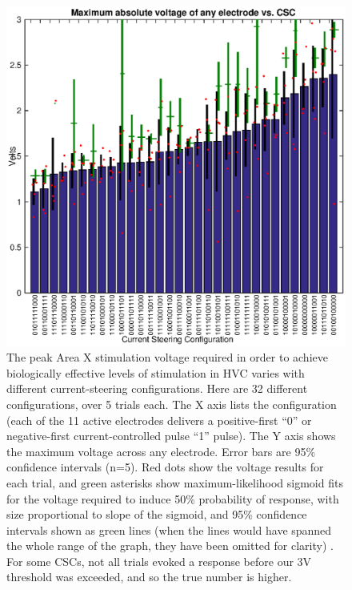 \documentclass[10pt,letterpaper]{article}
\begin{document}
\begin{figure}
  \includegraphics[width=\textwidth]{VoltageVsCSC}
  \caption{The peak Area X stimulation voltage required in order to achieve biologically effective levels of stimulation in HVC varies with different current-steering configurations.  Here are 32 different configurations, over 5 trials each.  The X axis lists the configuration (each of the 11 active electrodes delivers a positive-first ``0'' or negative-first current-controlled pulse ``1'' pulse).  The Y axis shows the maximum voltage across any electrode.  Error bars are 95\% confidence intervals (n=5).  Red dots show the voltage results for each trial, and green asterisks show maximum-likelihood sigmoid fits for the voltage required to induce 50\% probability of response, with size proportional to slope of the sigmoid, and 95\% confidence intervals shown as green lines (when the lines would have spanned the whole range of the graph, they have been omitted for clarity) .  For some CSCs, not all trials evoked a response before our 3V threshold was exceeded, and so the true number is higher.}
  \label{fig:VoltageVsCSC}
\end{figure}
\end{document}
